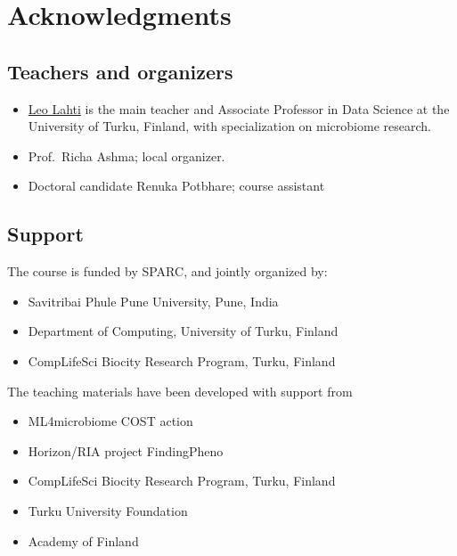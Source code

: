\documentclass[
  oneside]{book}
\providecommand{\tightlist}{%
  \setlength{\itemsep}{0pt}\setlength{\parskip}{0pt}}
\begin{document}
\hypertarget{acknowledgments}{%
\chapter{Acknowledgments}\label{acknowledgments}}

\hypertarget{teachers-and-organizers}{%
\section{Teachers and organizers}\label{teachers-and-organizers}}

\begin{itemize}
\item
  \href{https://datascience.utu.fi}{Leo Lahti} is the main teacher and
  Associate Professor in Data Science at the University of Turku,
  Finland, with specialization on microbiome research.
\item
  Prof.~Richa Ashma; local organizer.
\item
  Doctoral candidate Renuka Potbhare; course assistant
\end{itemize}

\hypertarget{support}{%
\section{Support}\label{support}}

The course is funded by SPARC, and jointly organized by:

\begin{itemize}
\tightlist
\item
  Savitribai Phule Pune University, Pune, India
\item
  Department of Computing, University of Turku, Finland
\item
  CompLifeSci Biocity Research Program, Turku, Finland
\end{itemize}

The teaching materials have been developed with support from

\begin{itemize}
\tightlist
\item
  ML4microbiome COST action
\item
  Horizon/RIA project FindingPheno
\item
  CompLifeSci Biocity Research Program, Turku, Finland
\item
  Turku University Foundation
\item
  Academy of Finland
\end{itemize}
\end{document}
